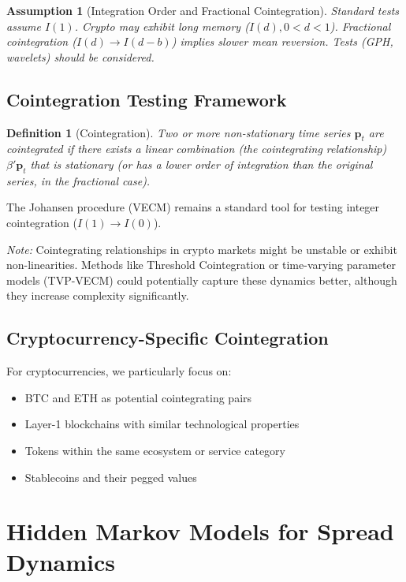 \documentclass{article}
\newtheorem{definition}{Definition}
\newtheorem{assumption}{Assumption}
\begin{document}
\begin{assumption}[Integration Order and Fractional Cointegration]
Standard tests assume $I(1)$. Crypto may exhibit long memory ($I(d), 0 < d < 1$). Fractional cointegration ($I(d) \rightarrow I(d-b)$) implies slower mean reversion. Tests (GPH, wavelets) should be considered.
\end{assumption}

\subsection{Cointegration Testing Framework}

\begin{definition}[Cointegration]
Two or more non-stationary time series $\mathbf{p}_t$ are cointegrated if there exists a linear combination (the cointegrating relationship) $\beta' \mathbf{p}_t$ that is stationary (or has a lower order of integration than the original series, in the fractional case).
\end{definition}

The Johansen procedure (VECM) remains a standard tool for testing integer cointegration ($I(1) \rightarrow I(0)$).

\textit{Note:} Cointegrating relationships in crypto markets might be unstable or exhibit non-linearities. Methods like Threshold Cointegration or time-varying parameter models (TVP-VECM) could potentially capture these dynamics better, although they increase complexity significantly.

\subsection{Cryptocurrency-Specific Cointegration}

For cryptocurrencies, we particularly focus on:
\begin{itemize}
    \item BTC and ETH as potential cointegrating pairs
    \item Layer-1 blockchains with similar technological properties
    \item Tokens within the same ecosystem or service category
    \item Stablecoins and their pegged values
\end{itemize}

\section{Hidden Markov Models for Spread Dynamics}
\end{document}
